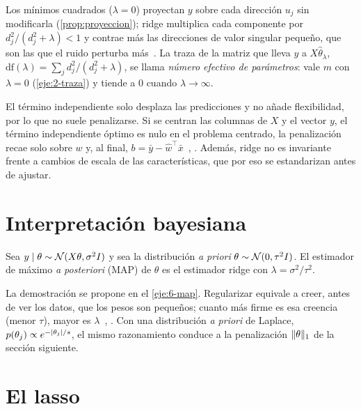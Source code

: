 Los mínimos cuadrados ($\lambda=0$) proyectan $y$ sobre cada dirección $u_j$ sin modificarla (\cref{prop:proyeccion}); ridge multiplica cada componente por $d_j^{2}/(d_j^{2}+\lambda)<1$ y contrae más las direcciones de valor singular pequeño, que son las que el ruido perturba más~\cite[§3.4.1]{esl}. La traza de la matriz que lleva $y$ a $X\hat\theta_\lambda$, $\mathrm{df}(\lambda)=\sum_j d_j^{2}/(d_j^{2}+\lambda)$, se llama \emph{número efectivo de parámetros}: vale $m$ con $\lambda=0$ (\cref{eje:2-traza}) y tiende a 0 cuando $\lambda\to\infty$.

\addtocounter{definicion}{1}%

\begin{observacion}
El término independiente solo desplaza las predicciones y no añade flexibilidad, por lo que no suele penalizarse. Si se centran las columnas de $X$ y el vector $y$, el término independiente óptimo es nulo en el problema centrado, la penalización recae solo sobre $w$ y, al final, $b=\bar y-\hat w^{\top}\bar x$~\cite[§2.6 y §2.7.2]{mit6390}, \cite[§3.4.1]{esl}. Además, ridge no es invariante frente a cambios de escala de las características, que por eso se estandarizan antes de ajustar.
\end{observacion}

\section{Interpretación bayesiana}

\begin{proposicion}\label{prop:map}
Sea $y\mid\theta\sim\mathcal{N}(X\theta,\sigma^{2}I)$ y sea la distribución \emph{a priori} $\theta\sim\mathcal{N}(0,\tau^{2}I)$. El estimador de máximo \emph{a posteriori} (MAP) de $\theta$ es el estimador ridge con $\lambda=\sigma^{2}/\tau^{2}$.
\end{proposicion}

La demostración se propone en el \cref{eje:6-map}. Regularizar equivale a creer, antes de ver los datos, que los pesos son pequeños; cuanto más firme es esa creencia (menor $\tau$), mayor es $\lambda$~\cite[§9.4]{cs229}, \cite[§3.1.4]{bishop}. Con una distribución \emph{a priori} de Laplace, $p(\theta_j)\propto e^{-\lvert\theta_j\rvert/s}$, el mismo razonamiento conduce a la penalización $\lVert\theta\rVert_1$ de la sección siguiente.

\section{El lasso}

